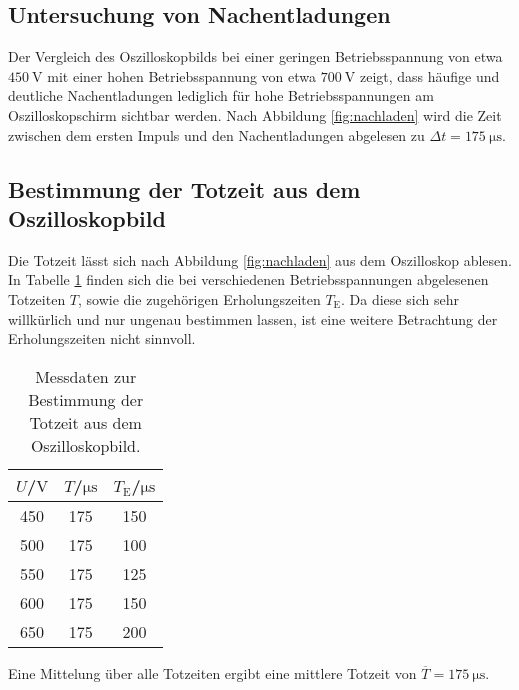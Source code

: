 \subsection{Untersuchung von Nachentladungen}
Der Vergleich des Oszilloskopbilds bei einer geringen Betriebsspannung von etwa $\SI{450}{\volt}$ mit einer hohen Betriebsspannung von etwa $\SI{700}{\volt}$ zeigt, dass häufige und deutliche Nachentladungen lediglich für hohe Betriebsspannungen am Oszilloskopschirm sichtbar werden.
Nach Abbildung \ref{fig:nachladen} wird die Zeit zwischen dem ersten Impuls und den Nachentladungen abgelesen zu $\Delta t=\SI{175}{\micro\second}$.


\subsection{Bestimmung der Totzeit aus dem Oszilloskopbild}
Die Totzeit lässt sich nach Abbildung \ref{fig:nachladen} aus dem Oszilloskop ablesen.
In Tabelle \ref{tab:c} finden sich die bei verschiedenen Betriebsspannungen abgelesenen Totzeiten $T$, sowie die zugehörigen Erholungszeiten $T_\mathrm{E}$.
Da diese sich sehr willkürlich und nur ungenau bestimmen lassen, ist eine weitere Betrachtung der Erholungszeiten nicht sinnvoll.
\begin{table}
  \centering
  \caption{Messdaten zur Bestimmung der Totzeit aus dem Oszilloskopbild.}
  \label{tab:c}
\begin{tabular}{ccc}
  \toprule
$U$/$\si{\volt}$ & $T$/$\si{\micro\second}$ & $T_\mathrm{E}$/$\si{\micro\second}$ \\
\midrule
450  & 175  & 150  \\
500  & 175  & 100  \\
550  & 175  & 125  \\
600  & 175  & 150  \\
650  & 175  & 200  \\
\bottomrule
\end{tabular}
\end{table}
Eine Mittelung über alle Totzeiten ergibt eine mittlere Totzeit von $\overline{T}=\SI{175}{\micro\second}$.

